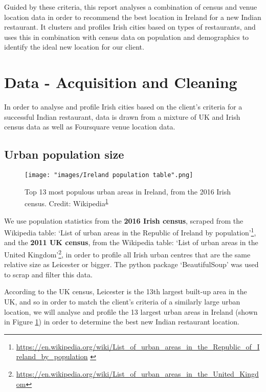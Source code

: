 \documentclass[a4paper,11pt]{article}
\begin{document}
Guided by these criteria, this report analyses a combination of census and venue location data in order to recommend the best location in Ireland for a new Indian restaurant. It clusters and profiles Irish cities based on types of restaurants, and uses this in combination with census data on population and demographics to identify the ideal new location for our client.

\section{Data - Acquisition and Cleaning}\label{sec: data}
In order to analyse and profile Irish cities based on the client's criteria for a successful Indian restaurant, data is drawn from a mixture of UK and Irish census data as well as Foursquare venue location data.

\subsection{Urban population size}
\begin{figure}[htb]
   \centering
   \texttt{[image: "images/Ireland population table".png]}
      \caption{Top 13 most populous urban areas in Ireland, from the 2016 Irish census. Credit: Wikipedia\textsuperscript{\ref{footnote:irish pop}}}
      \label{fig:irish pop table}
\end{figure}
We use population statistics from the \textbf{2016 Irish census}, scraped from the Wikipedia table: `List of urban areas in the Republic of Ireland by population'\footnote{\url{https://en.wikipedia.org/wiki/List_of_urban_areas_in_the_Republic_of_Ireland_by_population} \label{footnote:irish pop}}, and the \textbf{2011 UK census}, from the Wikipedia table: `List of urban areas in the United Kingdom'\footnote{\url{https://en.wikipedia.org/wiki/List_of_urban_areas_in_the_United_Kingdom}}, in order to profile all Irish urban centres that are the same relative size as Leicester or bigger. The python package `BeautifulSoup' was used to scrap and filter this data.

According to the UK census, Leicester is the 13th largest built-up area in the UK, and so in order to match the client's criteria of a similarly large urban location, we will analyse and profile the 13 largest urban areas in Ireland (shown in Figure \ref{fig:irish pop table}) in order to determine the best new Indian restaurant location.

\end{document}
